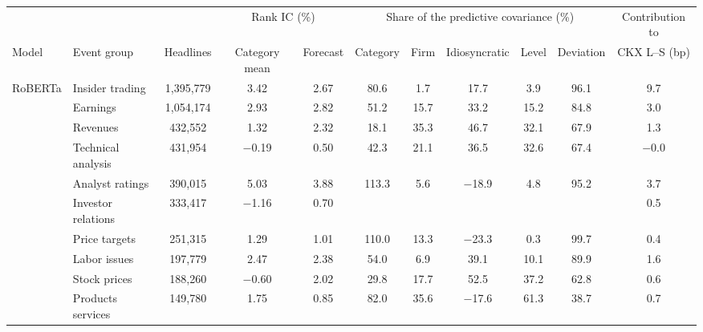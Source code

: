 \begin{table}[htbp]
{\footnotesize
\begin{adjustbox}{max width=\linewidth, max totalheight=0.75\textheight}
\begin{tabular}{llccccccccc}
\toprule
\multicolumn{3}{c}{} & \multicolumn{2}{c}{Rank IC (\%)} & \multicolumn{5}{c}{Share of the predictive covariance (\%)} & Contribution to \\
\cmidrule(lr){4-5} \cmidrule(lr){6-10}
Model & Event group & Headlines & Category mean & Forecast & Category & Firm & Idiosyncratic & Level & Deviation & CKX L--S (bp) \\
\midrule
RoBERTa & Insider trading & 1,395,779 & \phantom{$-$}3.42 & \phantom{$-$}2.67 & \phantom{0}80.6 & \phantom{$-$0}1.7 & \phantom{$-$}17.7 & \phantom{$-$0}3.9 & \phantom{0}96.1 & \phantom{$-$}9.7 \\
 & Earnings & 1,054,174 & \phantom{$-$}2.93 & \phantom{$-$}2.82 & \phantom{0}51.2 & \phantom{$-$}15.7 & \phantom{$-$}33.2 & \phantom{$-$}15.2 & \phantom{0}84.8 & \phantom{$-$}3.0 \\
 & Revenues & \phantom{,0}432,552 & \phantom{$-$}1.32 & \phantom{$-$}2.32 & \phantom{0}18.1 & \phantom{$-$}35.3 & \phantom{$-$}46.7 & \phantom{$-$}32.1 & \phantom{0}67.9 & \phantom{$-$}1.3 \\
 & Technical analysis & \phantom{,0}431,954 & $-$0.19 & \phantom{$-$}0.50 & \phantom{0}42.3 & \phantom{$-$}21.1 & \phantom{$-$}36.5 & \phantom{$-$}32.6 & \phantom{0}67.4 & $-$0.0 \\
 & Analyst ratings & \phantom{,0}390,015 & \phantom{$-$}5.03 & \phantom{$-$}3.88 & 113.3 & \phantom{$-$0}5.6 & $-$18.9 & \phantom{$-$0}4.8 & \phantom{0}95.2 & \phantom{$-$}3.7 \\
 & Investor relations & \phantom{,0}333,417 & $-$1.16 & \phantom{$-$}0.70 &  &  &  &  &  & \phantom{$-$}0.5 \\
 & Price targets & \phantom{,0}251,315 & \phantom{$-$}1.29 & \phantom{$-$}1.01 & 110.0 & \phantom{$-$}13.3 & $-$23.3 & \phantom{$-$0}0.3 & \phantom{0}99.7 & \phantom{$-$}0.4 \\
 & Labor issues & \phantom{,0}197,779 & \phantom{$-$}2.47 & \phantom{$-$}2.38 & \phantom{0}54.0 & \phantom{$-$0}6.9 & \phantom{$-$}39.1 & \phantom{$-$}10.1 & \phantom{0}89.9 & \phantom{$-$}1.6 \\
 & Stock prices & \phantom{,0}188,260 & $-$0.60 & \phantom{$-$}2.02 & \phantom{0}29.8 & \phantom{$-$}17.7 & \phantom{$-$}52.5 & \phantom{$-$}37.2 & \phantom{0}62.8 & \phantom{$-$}0.6 \\
 & Products services & \phantom{,0}149,780 & \phantom{$-$}1.75 & \phantom{$-$}0.85 & \phantom{0}82.0 & \phantom{$-$}35.6 & $-$17.6 & \phantom{$-$}61.3 & \phantom{0}38.7 & \phantom{$-$}0.7 \\

\end{tabular}
\end{adjustbox}}
\end{table}
